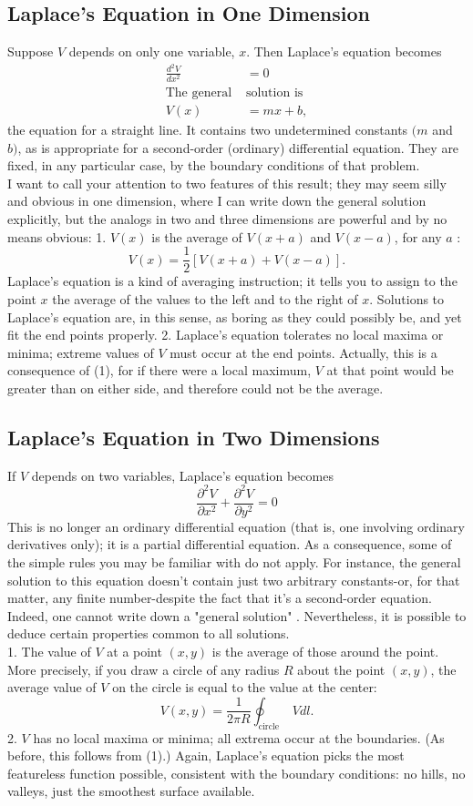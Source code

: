 \subsection{Laplace's Equation in One Dimension}
Suppose $V$ depends on only one variable, $x$. Then Laplace's equation becomes
\begin{align*}
\frac{d^{2} V}{d x^{2}}&=0\\
\text{The general }&\text{solution is}\\
V(x)&=m x+b,
\end{align*}
the equation for a straight line. It contains two undetermined constants $(m$ and $b)$, as is appropriate for a second-order (ordinary) differential equation. They are fixed, in any particular case, by the boundary conditions of that problem.\\
I want to call your attention to two features of this result; they may seem silly and obvious in one dimension, where I can write down the general solution explicitly, but the analogs in two and three dimensions are powerful and by no means obvious:
1. $V(x)$ is the average of $V(x+a)$ and $V(x-a)$, for any $a$ :
$$
V(x)=\frac{1}{2}[V(x+a)+V(x-a)] .
$$
Laplace's equation is a kind of averaging instruction; it tells you to assign to the point $x$ the average of the values to the left and to the right of $x$. Solutions to Laplace's equation are, in this sense, as boring as they could possibly be, and yet fit the end points properly.
2. Laplace's equation tolerates no local maxima or minima; extreme values of $V$ must occur at the end points. Actually, this is a consequence of (1), for if there were a local maximum, $V$ at that point would be greater than on either side, and therefore could not be the average.
\subsection{Laplace's Equation in Two Dimensions}
If $V$ depends on two variables, Laplace's equation becomes
$$
\frac{\partial^{2} V}{\partial x^{2}}+\frac{\partial^{2} V}{\partial y^{2}}=0
$$
This is no longer an ordinary differential equation (that is, one involving ordinary derivatives only); it is a partial differential equation. As a consequence, some of the simple rules you may be familiar with do not apply. For instance, the general solution to this equation doesn't contain just two arbitrary constants-or, for that matter, any finite number-despite the fact that it's a second-order equation. Indeed, one cannot write down a "general solution" . Nevertheless, it is possible to deduce certain properties common to all solutions.\\
1. The value of $V$ at a point $(x, y)$ is the average of those around the point. More precisely, if you draw a circle of any radius $R$ about the point $(x, y)$, the average value of $V$ on the circle is equal to the value at the center:
$$
V(x, y)=\frac{1}{2 \pi R} \oint_{\text {circle }} V d l .
$$
2. $V$ has no local maxima or minima; all extrema occur at the boundaries. (As before, this follows from (1).) Again, Laplace's equation picks the most featureless function possible, consistent with the boundary conditions: no hills, no valleys, just the smoothest surface available.
